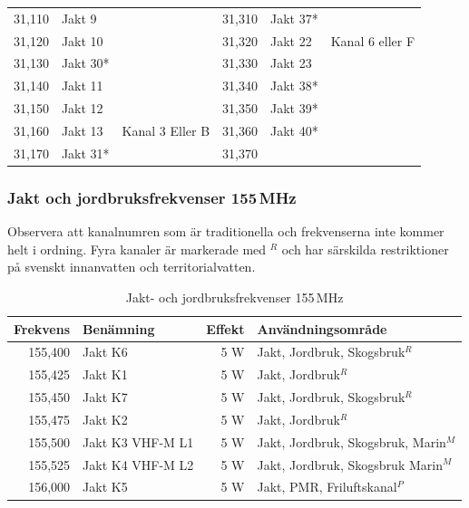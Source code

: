 \begin{longtable}{rll|rll}
	           31,110 & Jakt 9             &                   &   31,310          &   Jakt 37*         &                   \\
	           31,120 & Jakt 10            &                   &   31,320          &   Jakt 22          & Kanal 6 eller F   \\
	           31,130 & Jakt 30*           &                   &   31,330          &   Jakt 23          &                   \\
	           31,140 & Jakt 11            &                   &   31,340          &   Jakt 38*         &                   \\
	           31,150 & Jakt 12            &                   &   31,350          &   Jakt 39*        &                   \\
	           31,160 & Jakt 13            & Kanal 3 Eller B   &   31,360          &   Jakt 40*         &                   \\
	           31,170 & Jakt 31*           &                   &   31,370          &                    &
\end{longtable}




\subsubsection{Jakt och jordbruksfrekvenser 155\,MHz}

Observera att kanalnumren som är traditionella och frekvenserna inte kommer helt i ordning. Fyra kanaler är markerade med $^R$ och har särskilda restriktioner på svenskt innanvatten och territorialvatten.

\begin{table}[H]
\centering
\begin{tabular}{rlrl}
	\textbf{Frekvens} & \textbf{Benämning} & \textbf{Effekt} & \textbf{Användningsområde}           \\ \hline
	          155,400 & Jakt K6            &             5 W & Jakt, Jordbruk, Skogsbruk$^R$        \\
	          155,425 & Jakt K1            &             5 W & Jakt, Jordbruk$^R$                   \\
	          155,450 & Jakt K7            &             5 W & Jakt, Jordbruk, Skogsbruk$^R$        \\
	          155,475 & Jakt K2            &             5 W & Jakt, Jordbruk$^R$                   \\
	          155,500 & Jakt K3 VHF-M L1   &             5 W & Jakt, Jordbruk, Skogsbruk, Marin$^M$ \\
	          155,525 & Jakt K4 VHF-M L2   &             5 W & Jakt, Jordbruk, Skogsbruk Marin$^M$  \\
	          156,000 & Jakt K5            &             5 W & Jakt, PMR, Friluftskanal$^P$
\end{tabular}
\caption{Jakt- och jordbruksfrekvenser 155\,MHz}
\end{table}

